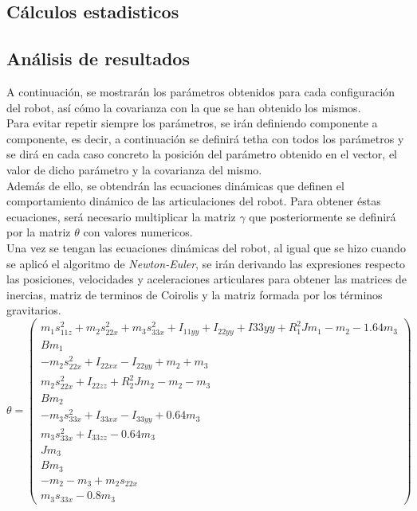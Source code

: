	\subsection{Cálculos estadisticos}
	\subsection{Análisis de resultados}
	A continuación, se mostrarán los parámetros obtenidos para cada configuración del robot, así cómo la covarianza con la que se han obtenido los mismos.\\
	Para evitar repetir siempre los parámetros, se irán definiendo componente a componente, es decir, a continuación se definirá tetha con todos los parámetros y se dirá en cada caso concreto la posición del parámetro obtenido en el vector, el valor de dicho parámetro y la covarianza del mismo. \\

	Además de ello, se obtendrán las ecuaciones dinámicas que definen el comportamiento dinámico de las articulaciones del robot. Para obtener éstas ecuaciones, será necesario multiplicar la matriz $\gamma$ que posteriormente se definirá por la matriz $\theta$ con valores numericos. \\
	Una vez se tengan las ecuaciones dinámicas del robot, al igual que se hizo cuando se aplicó el algoritmo de \textit{Newton-Euler}, se irán derivando las expresiones respecto las posiciones, velocidades y aceleraciones articulares para obtener las matrices de inercias, matriz de terminos de Coirolis y la matriz formada por los términos gravitarios.
\begin{equation}
\theta=
	\begin{pmatrix}
		  m_{1}s_{11z}^{2} + m_{2}s_{22x}^{2} + m_{3}s_{33x}^{2} + I_{11yy} + I_{22yy} + I{33yy} + R_{1}^{2}Jm_1 - m_2 - 1.64m_3 \\
		  Bm_{1}  \\
		  -m_{2}s_{22x}^{2} + I_{22xx} - I_{22yy} + m_{2} + m_{3} \\
		  m_{2}s_{22x}^{2} + I_{22zz} + R_{2}^{2}Jm_{2} - m_{2} - m_{3}  \\
		  Bm_{2} \\
		  - m_{3}s_{33x}^{2} + I_{33xx} - I_{33yy} + 0.64m_{3} \\
		  m_{3}s_{33x}^{2} + I_{33zz} - 0.64m_{3}  \\
		  Jm_{3}  \\
		  Bm_{3}  \\
		  -m_{2} -m_{3} + m_{2}s_{22x}  \\
		  m_{3}s_{33x} - 0.8m_{3}
	\end{pmatrix}
\end{equation}

